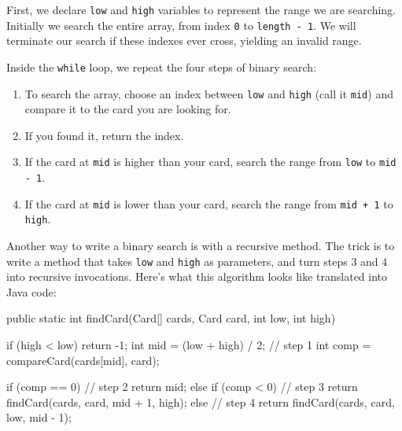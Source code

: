 \documentclass[12pt]{book}
\makeatletter
\renewcommand{\section}{\@startsection {section}{1}{\z@}%
    {-3.5ex \@plus -1ex \@minus -.2ex}%
    {0.7ex \@plus.2ex}%
    {\normalfont\Large\bfseries}}
\theoremstyle{exercise}
\newcommand{\java}[1]{\lstinline{#1}} %
\makeatother
\begin{document}
First, we declare \java{low} and \java{high} variables to represent the range we are searching.
Initially we search the entire array, from index \java{0} to \java{length - 1}.
We will terminate our search if these indexes ever cross, yielding an invalid range.

Inside the \java{while} loop, we repeat the four steps of binary search:

\begin{enumerate}

\item To search the array, choose an index between \java{low} and \java{high} (call it \java{mid}) and compare it to the card you are looking for.

\item If you found it, return the index.

\item If the card at \java{mid} is higher than your card, search the range from \java{low} to \java{mid - 1}.

\item If the card at \java{mid} is lower than your card, search the range from \java{mid + 1} to \java{high}.

\end{enumerate}



Another way to write a binary search is with a recursive method.
The trick is to write a method that takes \java{low} and \java{high} as parameters, and turn steps 3 and 4 into recursive invocations.
Here's what this algorithm looks like translated into Java code:

\begin{code}
public static int findCard(Card[] cards, Card card,
                           int low, int high) {
    if (high < low) {
        return -1;
    }
    int mid = (low + high) / 2;                       // step 1
    int comp = compareCard(cards[mid], card);

    if (comp == 0) {                                  // step 2
        return mid;
    } else if (comp < 0) {                            // step 3
        return findCard(cards, card, mid + 1, high);
    } else {                                          // step 4
        return findCard(cards, card, low, mid - 1);
    }
}
\end{code}
\end{document}
